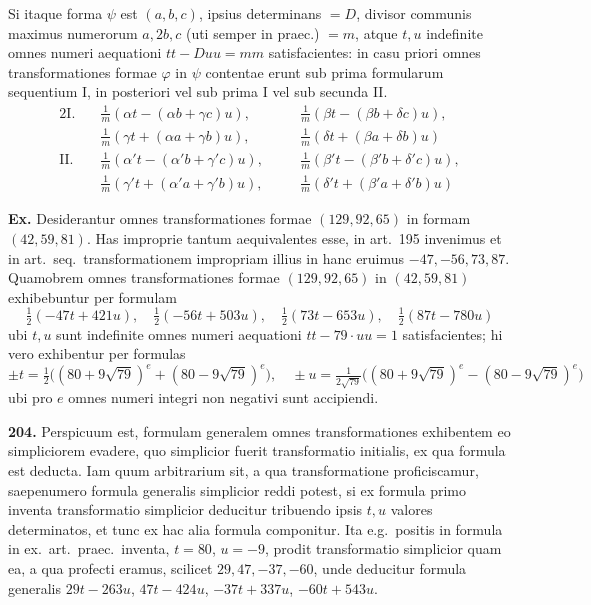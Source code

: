 \documentclass[12pt,a4paper]{article}
\theoremstyle{plain}
\theoremstyle{definition}
\theoremstyle{remark}
\begin{document}
Si itaque forma $\psi$ est $(a,b,c)$, ipsius determinans $=D$, divisor communis maximus numerorum $a,2b,c$ (uti semper in praec.) $=m$, atque $t,u$ indefinite omnes numeri aequationi $tt-Duu=mm$ satisfacientes: in casu priori omnes transformationes formae $\varphi$ in $\psi$ contentae erunt sub prima formularum sequentium I, in posteriori vel sub prima I vel sub secunda II.
\begin{alignat*}{2}
\text{I.}\quad&\tfrac{1}{m}(\alpha t-(\alpha b+\gamma c)u),\quad &&\tfrac{1}{m}(\beta t-(\beta b+\delta c)u),\\
&\tfrac{1}{m}(\gamma t+(\alpha a+\gamma b)u),\quad &&\tfrac{1}{m}(\delta t+(\beta a+\delta b)u)\\[1ex]
\text{II.}\quad&\tfrac{1}{m}(\alpha' t-(\alpha' b+\gamma' c)u),\quad &&\tfrac{1}{m}(\beta' t-(\beta' b+\delta' c)u),\\
&\tfrac{1}{m}(\gamma' t+(\alpha' a+\gamma' b)u),\quad &&\tfrac{1}{m}(\delta' t+(\beta' a+\delta' b)u)
\end{alignat*}

\textbf{Ex.} Desiderantur omnes transformationes formae $(129,92,65)$ in formam $(42,59,81)$. Has improprie tantum aequivalentes esse, in art.~195 invenimus et in art.~seq.\ transformationem impropriam illius in hanc eruimus $-47,-56,73,87$. Quamobrem omnes transformationes formae $(129,92,65)$ in $(42,59,81)$ exhibebuntur per formulam
\[
\tfrac{1}{2}(-47t+421u),\quad \tfrac{1}{2}(-56t+503u),\quad \tfrac{1}{2}(73t-653u),\quad \tfrac{1}{2}(87t-780u)
\]
ubi $t,u$ sunt indefinite omnes numeri aequationi $tt-79\cdot uu=1$ satisfacientes; hi vero exhibentur per formulas
\[
\pm t=\tfrac{1}{2}\bigl((80+9\sqrt{79})^e+(80-9\sqrt{79})^e\bigr),\quad
\pm u=\tfrac{1}{2\sqrt{79}}\bigl((80+9\sqrt{79})^e-(80-9\sqrt{79})^e\bigr)
\]
ubi pro $e$ omnes numeri integri non negativi sunt accipiendi.

\textbf{204.}
Perspicuum est, formulam generalem omnes transformationes exhibentem eo simpliciorem evadere, quo simplicior fuerit transformatio initialis, ex qua formula est deducta. Iam quum arbitrarium sit, a qua transformatione proficiscamur, saepenumero formula generalis simplicior reddi potest, si ex formula primo inventa transformatio simplicior deducitur tribuendo ipsis $t,u$ valores determinatos, et tunc ex hac alia formula componitur. Ita e.g.\ positis in formula in ex.\ art.\ praec.\ inventa, $t=80$, $u=-9$, prodit transformatio simplicior quam ea, a qua profecti eramus, scilicet $29,47,-37,-60$, unde deducitur formula generalis $29t-263u$, $47t-424u$, $-37t+337u$, $-60t+543u$.
\end{document}
